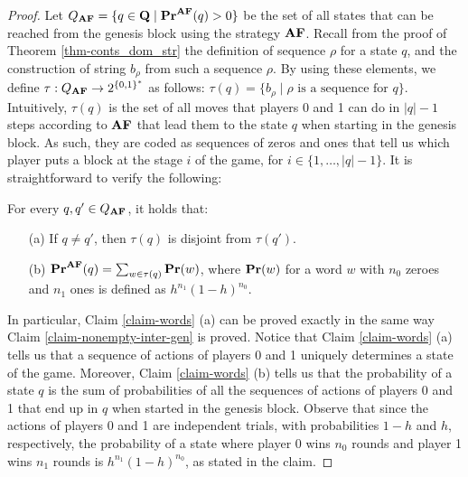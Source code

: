\begin{proof}
Let $Q_{\text{\rm {\bf AF}}} = \{q \in \mathbf{Q} \mid \mathbf{Pr}^{\text{\rm {\bf AF}}}(q) > 0\}$ be the set of all states that can be reached from the genesis block using the strategy $\text{\rm {\bf AF}}$. Recall from the proof of Theorem \ref{thm-conts_dom_str} the definition of sequence $\rho$ for a state $q$, and the construction of string $b_\rho$ from such a sequence $\rho$.
By using these elements, we define $\tau:Q_{\text{\rm {\bf AF}}} \to 2^{\{0,1\}^*}$ as follows:
$\tau(q) = \{ b_\rho \mid \rho \text{ is a sequence for } q\}$.
Intuitively, $\tau(q)$ is the set of all moves that players 0 and 1 can do in $|q|-1$ steps according to $\text{\rm {\bf AF}}$ that lead them to the state $q$ when starting in the genesis block. As such, they are coded as sequences of zeros and ones that tell us which player puts a block at the stage $i$ of the game, for $i \in \{ 1,\ldots, |q|-1\}$. It is straightforward to verify the following:
\begin{myclaim}\label{claim-words} For every $q, q'\in Q_{\text{\rm {\bf AF}}}$, it holds that:
\begin{itemize}
\item[(a)] If $q\neq q'$, then $\tau(q)$ is disjoint from $\tau(q')$.
\item[(b)] $\mathbf{Pr}^{\text{\rm {\bf AF}}}(q) = \sum_{w \in \tau(q)} \mathbf{Pr}(w)$, where $\mathbf{Pr}(w)$ for a word $w$ with $n_0$ zeroes and $n_1$ ones is defined as 
$h^{n_1}(1-h)^{n_0}$.
\end{itemize}
\end{myclaim}
In particular, Claim \ref{claim-words} (a) can be proved exactly in the same way Claim \ref{claim-nonempty-inter-gen} is proved. Notice that Claim \ref{claim-words} (a)
tells us that a sequence of actions of players 0 and 1 uniquely determines a state of the game. 
Moreover, Claim \ref{claim-words} (b)
tells us that the probability of a state $q$ is the sum of probabilities of all the sequences of actions of players 0 and 1 that end up in $q$ when started in the genesis block. Observe that since the actions of players 0 and 1 are independent trials, with probabilities $1-h$ and $h$, respectively, the probability of a state where player 0 wins $n_0$ rounds and player 1 wins $n_1$ rounds is $h^{n_1}(1-h)^{n_0}$, as stated in the claim.



\end{proof}
